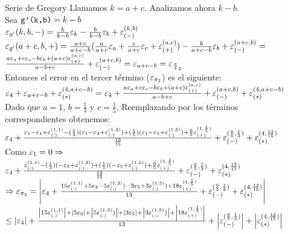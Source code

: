 \begin{subsubsection}{Serie de Gregory}
	Llamamos $k=a+c$. Analizamos ahora $k-b$.\\
	
	Sea $\funcFull{g'(k,b)}{k-b}$\\
	
	$\e{g'}{k,b,-} = \frac{k}{k-b}\ev{k} - \frac{b}{k-b}\ev{b} + \er{-}{k,b}$\\
	
	$\e{g'}{a+c,b,+} = \frac{a+c}{a+c-b}(\frac{a}{a+c}\ev{a} + \frac{c}{a+c}\ev{c} + \er{+}{a,c}) - \frac{b}{a+c-b}\ev{b} + \er{-}{a+c,b} =$\\
	
	$\frac{a\ev{a} + c\ev{c} - b\ev{b} + (a+c)\er{+}{a,c}}{a-b+c} + \er{-}{a+c,b} = \ev{a+c-b} = \ev{\frac{\pi}{4}_2}$\\
	
	Entonces el error en el tercer término ($\ev{\pi_2}$) es el siguiente:\\
	
	$\ev{4} + \ev{a+c-b} + \er{*}{4,a+c-b} = \ev{4} + \frac{a\ev{a} + c\ev{c} - b\ev{b} + (a+c)\er{+}{a,c}}{a-b+c} + \er{-}{a+c,b} + \er{*}{4,a+c-b}$\\
	
	Dado que $a=1$, $b=\frac{1}{3}$ y $c=\frac{1}{5}$. Reemplazando por los términos\\
	correspondientes obtenemos:\\
	
	$\ev{4} + \frac{\ev{1} - \ev{1} + \er{:}{1,1} - (\frac{1}{3})(\ev{1} - \ev{3} + \er{:}{1,3}) + (\frac{1}{5})(\ev{1} - \ev{5} + \er{:}{1,5}) + \frac{6}{5} \er{+}{1,\frac{1}{5}}}{\frac{13}{15}} + \er{-}{\frac{6}{5},\frac{1}{3}} + \er{*}{4,\frac{13}{15}}$\\
	
	Como $\ev{1}=0 \Rightarrow$\\
	
	$\ev{4} + \frac{\er{:}{1,1} - (\frac{1}{3})(- \ev{3} + \er{:}{1,3}) + (\frac{1}{5})(- \ev{5} + \er{:}{1,5}) + \frac{6}{5} \er{+}{1,\frac{1}{5}}}{\frac{13}{15}} + \er{-}{\frac{6}{5},\frac{1}{3}} + \er{*}{4,\frac{13}{15}}$\\
	
	$\Rightarrow \ev{\pi_2} = \left| \ev{4} + \frac{15\er{:}{1,1} + 5\ev{3} - 5\er{:}{1,3}) - 3\ev{5} + 3\er{:}{1,5}) + 18\er{+}{1,\frac{1}{5}}}{13} + \er{-}{\frac{6}{5},\frac{1}{3}} + \er{*}{4,\frac{13}{15}} \right|$\\
	
	$\leq \left|\ev{4}\right| + \frac{ \left|15\er{:}{1,1}\right| + \left|5\ev{3}\right| + \left|5\er{:}{1,3})\right| + \left|3\ev{5}\right| + \left|3\er{:}{1,5})\right| + \left|18\er{+}{1,\frac{1}{5}}\right|}{13} + \left|\er{-}{\frac{6}{5} ,\frac{1}{3}}\right| + \left|\er{*}{4,\frac{13}{15}}\right|$\\
		

\end{subsubsection}

